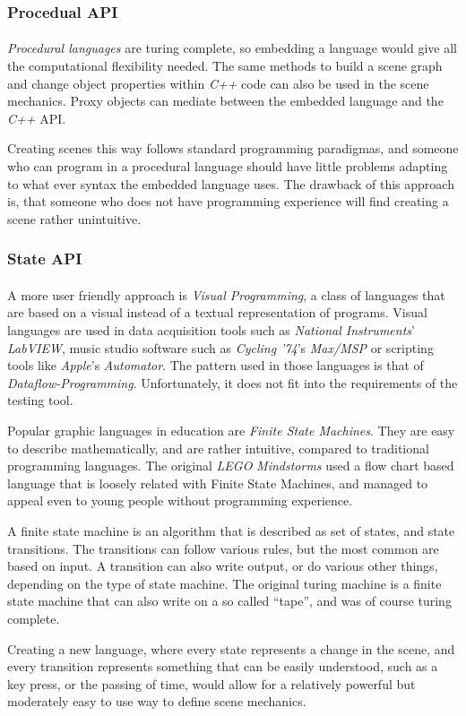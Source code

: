 \subsubsection{Procedual API}
\paragraph{}
\textit{Procedural languages} are turing complete, so embedding a language would give all the computational flexibility needed. The same methods to build a scene graph and change object properties within \textit{C++} code can also be used in the scene mechanics. Proxy objects can mediate between the embedded language and the \textit{C++} API.

Creating scenes this way follows standard programming paradigmas, and someone who can program in a procedural language should have little problems adapting to what ever syntax the embedded language uses. The drawback of this approach is, that someone who does not have programming experience will find creating a scene rather unintuitive.

\subsubsection{State API}
\paragraph{}
A more user friendly approach is \textit{Visual Programming}, a class of languages that are based on a visual instead of a textual representation of programs. Visual languages are used in data acquisition tools such as \textit{National Instruments}' \textit{LabVIEW}, music studio software such as \textit{Cycling '74}'s \textit{Max/MSP} or scripting tools like \textit{Apple}'s \textit{Automator}.
The pattern used in those languages is that of \textit{Dataflow-Programming}\cite{dataflow}. Unfortunately, it does not fit into the requirements of the testing tool.

Popular graphic languages in education are \textit{Finite State Machines}\cite{fsm}. They are easy to describe mathematically, and are rather intuitive, compared to traditional programming languages.
The original \textit{LEGO} \textit{Mindstorms} used a flow chart based language that is loosely related with Finite State Machines, and managed to appeal even to young people without programming experience.

A finite state machine is an algorithm that is described as set of states, and state transitions. The transitions can follow various rules, but the most common are based on input. A transition can also write output, or do various other things, depending on the type of state machine.
The original turing machine is a finite state machine that can also write on a so called ``tape'', and was of course turing complete.

Creating a new language, where every state represents a change in the scene, and every transition represents something that can be easily understood, such as a key press, or the passing of time, would allow for a relatively powerful but moderately easy to use way to define scene mechanics.

